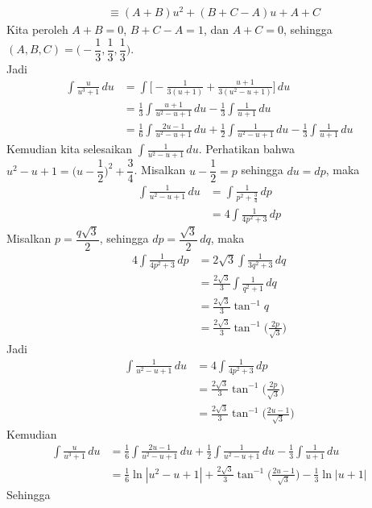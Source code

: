 \documentclass{article}
\begin{document}
\begin{enumerate}
\begin{align*}
	&\equiv (A+B)u^2+(B+C-A)u+A+C
	\end{align*}
	Kita peroleh $A+B=0$, $B+C-A=1$, dan $A+C=0$, sehingga $(A,B,C)=\Big(-\dfrac{1}{3},\dfrac{1}{3},\dfrac{1}{3}\Big)$. \\
	Jadi 
	\begin{align*}
	\int \frac{u}{u^3+1} \, du &= \int \bigg[-\frac{1}{3(u+1)}+\frac{u+1}{3(u^2-u+1)}\bigg] \, du \\
	&= \frac{1}{3} \int \frac{u+1}{u^2-u+1} \, du -\frac{1}{3} \int \frac{1}{u+1} \, du \\
	&= \frac{1}{6}\int \frac{2u-1}{u^2-u+1} \, du + \frac{1}{2} \int\frac{1}{u^2-u+1} \, du -\frac{1}{3} \int \frac{1}{u+1} \, du
	\end{align*}
	Kemudian kita selesaikan \(\displaystyle \int \frac{1}{u^2-u+1} \, du\). Perhatikan bahwa $u^2-u+1=\Big(u-\dfrac{1}{2}\Big)^2+\dfrac{3}{4}$. Misalkan $u-\dfrac{1}{2}=p$ sehingga $du=dp$, maka
	\begin{align*}
	\int \frac{1}{u^2-u+1} \, du &= \int \frac{1}{p^2+\frac{3}{4}} \, dp \\
	&= 4\int \frac{1}{4p^2+3} \, dp
	\end{align*}
	Misalkan $p=\dfrac{q\sqrt{3}}{2}$, sehingga $dp=\dfrac{\sqrt{3}}{2} \, dq$, maka
	\begin{align*}
	4\int \frac{1}{4p^2+3} \, dp &= 2\sqrt{3}\int \frac{1}{3q^2+3} \, dq \\
	&= \frac{2\sqrt{3}}{3}\int \frac{1}{q^2+1} \, dq \\
	&= \frac{2\sqrt{3}}{3} \tan^{-1}q \\
	&= \frac{2\sqrt{3}}{3} \tan^{-1}\Big(\frac{2p}{\sqrt{3}}\Big)
	\end{align*}
	Jadi 
	\begin{align*}
	\int \frac{1}{u^2-u+1} \, du &= 4\int \frac{1}{4p^2+3} \, dp \\
	&= \frac{2\sqrt{3}}{3} \tan^{-1}\Big(\frac{2p}{\sqrt{3}}\Big) \\
	&= \frac{2\sqrt{3}}{3} \tan^{-1}\Big(\frac{2u-1}{\sqrt{3}}\Big)
	\end{align*}
	Kemudian
	\begin{align*}
	\int \frac{u}{u^3+1} \, du &= \frac{1}{6}\int \frac{2u-1}{u^2-u+1} \, du + \frac{1}{2} \int\frac{1}{u^2-u+1} \, du -\frac{1}{3} \int \frac{1}{u+1} \, du \\
	&= \frac{1}{6}\ln|u^2-u+1|+\frac{2\sqrt{3}}{3} \tan^{-1}\Big(\frac{2u-1}{\sqrt{3}}\Big) - \frac{1}{3}\ln|u+1|
	\end{align*}
	Sehingga
	\begin{align*}

\end{align*}
\end{enumerate}
\end{document}
